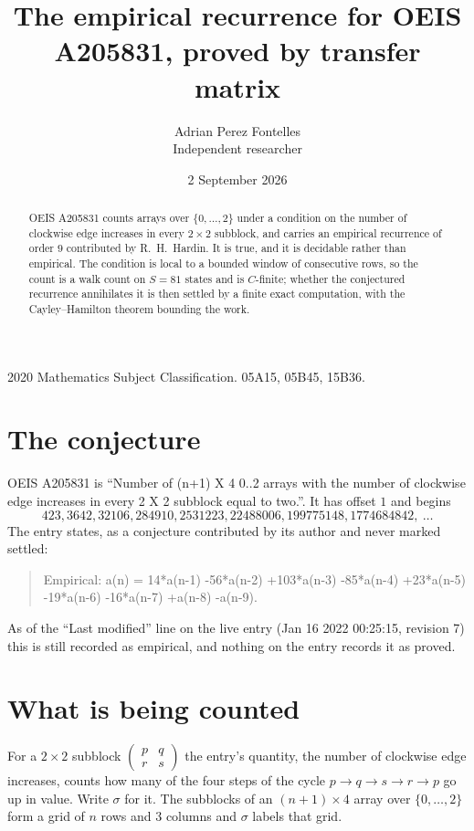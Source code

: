 \documentclass[11pt,a4paper]{article}
\title{The empirical recurrence for OEIS A205831, proved by transfer matrix}
\author{Adrian Perez Fontelles\\ \small Independent researcher}
\date{2 September 2026}
\theoremstyle{plain}
\theoremstyle{definition}
\begin{document}
\maketitle

\begin{abstract}
OEIS A205831 counts arrays over $\{0,\dots,2\}$ under a condition on the number of clockwise edge increases
in every $2\times2$ subblock, and carries an empirical recurrence of order $9$ contributed by
R.~H.~Hardin. It is true, and it is decidable rather than empirical. The condition is local to
a bounded window of consecutive rows, so the count is a walk count on $S=81$ states and is
$C$-finite; whether the conjectured recurrence annihilates it is then settled by a finite exact
computation, with the Cayley--Hamilton theorem bounding the work.
\end{abstract}

\noindent\small 2020 Mathematics Subject Classification. 05A15, 05B45, 15B36.\normalsize

\section{The conjecture}

OEIS A205831 is ``Number of (n+1) X 4 0..2 arrays with the number of clockwise edge increases in every 2 X 2 subblock equal to two.''. It has offset $1$ and begins
\[
423, 3642, 32106, 284910, 2531223, 22488006, 199775148, 1774684842,\ \dots
\]
The entry states, as a conjecture contributed by its author and never marked settled:
\begin{quote}
Empirical: a(n) = 14*a(n-1) -56*a(n-2) +103*a(n-3) -85*a(n-4) +23*a(n-5) -19*a(n-6) -16*a(n-7) +a(n-8) -a(n-9).
\end{quote}
As of the ``Last modified'' line on the live entry (Jan 16 2022 00:25:15, revision 7) this is still
recorded as empirical, and nothing on the entry records it as proved.

\section{What is being counted}

For a $2\times2$ subblock $\begin{pmatrix}p&q\\r&s\end{pmatrix}$ the
entry's quantity, the number of clockwise edge increases, counts how many of the four steps of the cycle $p\to q\to s\to r\to p$ go up in value. Write $\sigma$ for it. The subblocks of an
$(n+1)\times4$ array over $\{0,\dots,2\}$ form a grid of $n$ rows and $3$
columns and $\sigma$ labels that grid.
\end{document}
